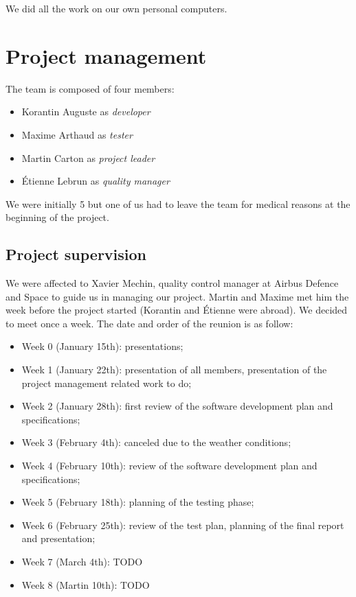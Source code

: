 \documentclass[openany, a4paper]{book}
\begin{document}
      We did all the work on our own personal computers.

  \chapter{Project management}
    The team is composed of four members:
    \begin{itemize}
      \item Korantin Auguste as \textit{developer}
      \item Maxime Arthaud as \textit{tester}
      \item Martin Carton as \textit{project leader}
      \item Étienne Lebrun as \textit{quality manager}
    \end{itemize}

    We were initially 5 but one of us had to leave the team for medical reasons
    at the beginning of the project.

    \section{Project supervision}
      We were affected to Xavier Mechin, quality control manager at Airbus
      Defence and Space to guide us in managing our project. Martin and Maxime
      met him the week before the project started (Korantin and Étienne were
      abroad). We decided to meet once a week. The date and order of the reunion
      is as follow:

      \begin{itemize}
        \item Week 0 (January 15th): presentations;
        \item Week 1 (January 22th): presentation of all members, presentation
          of the project management related work to do;
        \item Week 2 (January 28th): first review of the software development
          plan and specifications;
        \item Week 3 (February 4th): canceled due to the weather conditions;
        \item Week 4 (February 10th): review of the software development plan
          and specifications;
        \item Week 5 (February 18th): planning of the testing phase;
        \item Week 6 (February 25th): review of the test plan, planning of the
          final report and presentation;
        \item Week 7 (March 4th): TODO
        \item Week 8 (Martin 10th): TODO
      \end{itemize}
\end{document}
